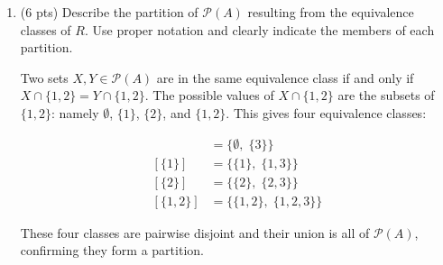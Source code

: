\documentclass[11pt]{article}
\begin{document}
\begin{enumerate}
\begin{enumerate}
\begin{proof}
\textbf{Transitive:} Let $X, Y, Z \in \mathcal{P}(A)$ and suppose $X\,R\,Y$ and $Y\,R\,Z$. Then $X \cap \{1,2\} = Y \cap \{1,2\}$ and $Y \cap \{1,2\} = Z \cap \{1,2\}$. By transitivity of equality, $X \cap \{1,2\} = Z \cap \{1,2\}$, so $X\,R\,Z$. Thus $R$ is transitive.

Since $R$ is reflexive, symmetric, and transitive, $R$ is an equivalence relation. \end{proof}

	\item (6 pts) Describe the partition of $\mathcal{P}(A)$ resulting from the equivalence classes of $R.$ Use proper notation and clearly indicate the members of each partition.
	
	Two sets $X, Y \in \mathcal{P}(A)$ are in the same equivalence class if and only if $X \cap \{1,2\} = Y \cap \{1,2\}$. The possible values of $X \cap \{1,2\}$ are the subsets of $\{1,2\}$: namely $\emptyset$, $\{1\}$, $\{2\}$, and $\{1,2\}$. This gives four equivalence classes:

\begin{align*}
[\emptyset] &= \{\emptyset,\; \{3\}\} \\[4pt]
[\{1\}]     &= \{\{1\},\; \{1,3\}\} \\[4pt]
[\{2\}]     &= \{\{2\},\; \{2,3\}\} \\[4pt]
[\{1,2\}]   &= \{\{1,2\},\; \{1,2,3\}\}
\end{align*}

These four classes are pairwise disjoint and their union is all of $\mathcal{P}(A)$, confirming they form a partition. 
	
	\end{enumerate}
\end{enumerate}
\end{document}
